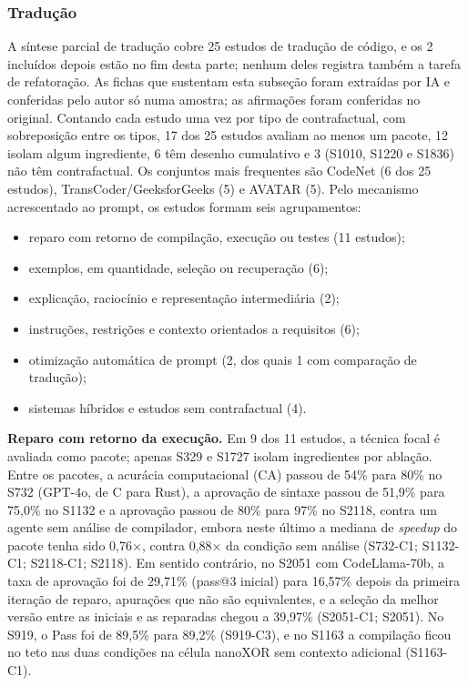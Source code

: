 \subsubsection{Tradução}

A síntese parcial de tradução cobre 25 estudos de tradução de código, e os 2 incluídos depois estão no fim desta
parte; nenhum deles registra também a tarefa de refatoração. As fichas que sustentam esta subseção foram extraídas por IA e conferidas pelo autor só numa amostra; as afirmações foram conferidas no original. Contando cada estudo uma vez por tipo de contrafactual, com sobreposição entre os tipos, 17 dos 25 estudos avaliam ao menos um pacote, 12 isolam algum ingrediente, 6 têm desenho cumulativo e 3 (S1010, S1220 e S1836) não têm contrafactual. Os conjuntos mais frequentes são CodeNet (6 dos 25 estudos), TransCoder/GeeksforGeeks (5) e AVATAR (5). Pelo mecanismo acrescentado ao prompt, os estudos formam seis agrupamentos:
\begin{itemize}
  \item reparo com retorno de compilação, execução ou testes (11 estudos);
  \item exemplos, em quantidade, seleção ou recuperação (6);
  \item explicação, raciocínio e representação intermediária (2);
  \item instruções, restrições e contexto orientados a requisitos (6);
  \item otimização automática de prompt (2, dos quais 1 com comparação de tradução);
  \item sistemas híbridos e estudos sem contrafactual (4).
\end{itemize}

\textbf{Reparo com retorno da execução.} Em 9 dos 11 estudos, a técnica focal é avaliada como pacote; apenas S329 e S1727 isolam ingredientes por ablação.
Entre os pacotes, a acurácia computacional (CA) passou de 54\% para 80\% no S732 (GPT-4o, de C para Rust), a aprovação de sintaxe passou de 51,9\% para 75,0\% no S1132 e a aprovação passou de 80\% para 97\% no S2118, contra um agente sem análise de compilador, embora neste último a mediana de \textit{speedup} do pacote tenha sido 0,76$\times$, contra 0,88$\times$ da condição sem análise (S732-C1; S1132-C1; S2118-C1; S2118).
Em sentido contrário, no S2051 com CodeLlama-70b, a taxa de aprovação foi de 29,71\% (pass@3 inicial) para 16,57\% depois da primeira iteração de reparo, apurações que não são equivalentes, e a seleção da melhor versão entre as iniciais e as reparadas chegou a 39,97\% (S2051-C1; S2051). No S919, o Pass foi de 89,5\% para 89,2\% (S919-C3), e no S1163 a compilação ficou no teto nas duas condições na célula nanoXOR sem contexto adicional (S1163-C1).

